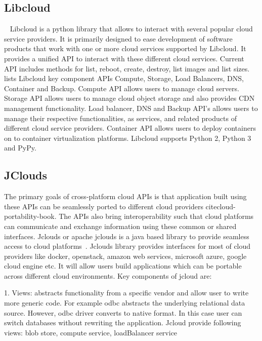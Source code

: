     \pv
     
\subsection{Libcloud}

    ~\cite{www-libcloudwiki} Libcloud is a python library that
     allows to interact with several popular cloud service
     providers. It is primarily designed to ease development of
     software products that work with one or more cloud services
     supported by Libcloud. It provides a unified API to interact with
     these different cloud services. Current API includes methods for
     list, reboot, create, destroy, list images and list
     sizes.~\cite{www-libclouddoc} lists Libcloud key component APIs
     Compute, Storage, Load Balancers, DNS, Container and
     Backup. Compute API allows users to manage cloud servers. Storage
     API allows users to manage cloud object storage and also provides
     CDN management functionality. Load balancer, DNS and Backup API’s
     allows users to manage their respective functionalities, as
     services, and related products of different cloud service
     providers. Container API allows users to deploy containers on to
     container virtualization platforms. Libcloud supports Python 2,
     Python 3 and PyPy.

     \pv
     
\subsection{JClouds}

The primary goals of cross-platform cloud APIs is that application
built using these APIs can be seamlessly ported to different cloud
providers cite{cloud-portability-book}.  The APIs also bring
interoperability such that cloud platforms can communicate and
exchange information using these common or shared interfaces.  Jclouds
or apache jclouds is a java based library to provide seamless access
to cloud platforms~\cite{www-jclouds}.  Jclouds library provides
interfaces for most of cloud providers like docker, openstack, amazon
web services, microsoft azure, google cloud engine etc. It will allow
users build applications which can be portable across different cloud
environments.  Key components of jcloud are:

     1. Views: abstracts functionality from a specific vendor and
        allow user to write more generic code. For example odbc
        abstracts the underlying relational data source. However, odbc
        driver converts to native format. In this case user can switch
        databases without rewriting the application. Jcloud provide
        following views: blob store, compute service, loadBalancer
        service

